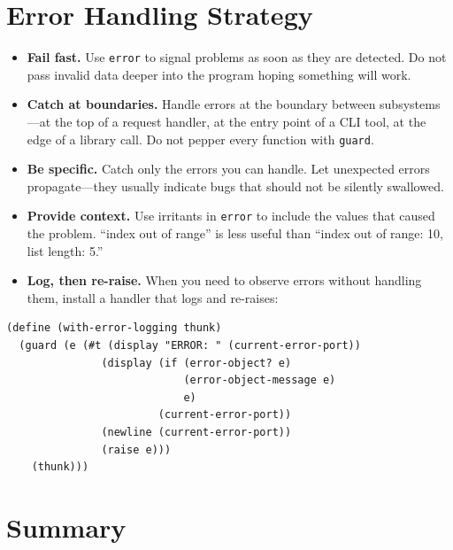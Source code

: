 \section{Error Handling Strategy}

\begin{itemize}
    \item \textbf{Fail fast.} Use \texttt{error} to signal problems as soon as they are detected. Do not pass invalid data deeper into the program hoping something will work.
    \item \textbf{Catch at boundaries.} Handle errors at the boundary between subsystems---at the top of a request handler, at the entry point of a CLI tool, at the edge of a library call. Do not pepper every function with \texttt{guard}.
    \item \textbf{Be specific.} Catch only the errors you can handle. Let unexpected errors propagate---they usually indicate bugs that should not be silently swallowed.
    \item \textbf{Provide context.} Use irritants in \texttt{error} to include the values that caused the problem. ``index out of range'' is less useful than ``index out of range: 10, list length: 5.''
    \item \textbf{Log, then re-raise.} When you need to observe errors without handling them, install a handler that logs and re-raises:
\end{itemize}

\begin{lstlisting}
(define (with-error-logging thunk)
  (guard (e (#t (display "ERROR: " (current-error-port))
               (display (if (error-object? e)
                            (error-object-message e)
                            e)
                        (current-error-port))
               (newline (current-error-port))
               (raise e)))
    (thunk)))
\end{lstlisting}

\section*{Summary}


